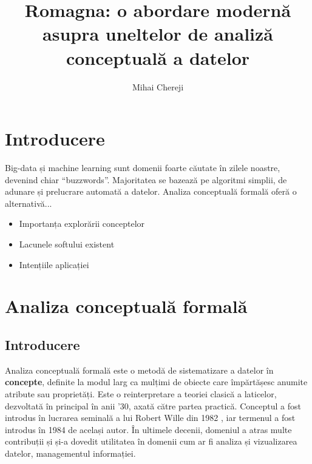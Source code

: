 \documentclass[12pt, a4paper, twoside, romanian]{teza-upb}
\begin{document}
\author{Mihai Chereji}

\title{Romagna: o abordare modernă asupra uneltelor de analiză conceptuală a datelor}




\beforepreface
\listoffigures
\listoftables
{}
\afterpreface 

\chapter*{Introducere}
  Big-data și machine learning sunt domenii foarte căutate în zilele noastre, devenind chiar “buzzwords”. Majoritatea se bazează pe algoritmi simplii, de adunare și prelucrare automată a datelor.
  Analiza conceptuală formală oferă o alternativă...
  
\begin{itemize}
  \item Importanța explorării conceptelor
  \item Lacunele softului existent
  \item Intențiile aplicației
\end{itemize}


\chapter{Analiza conceptuală formală}
  \section{Introducere}
    Analiza conceptuală formală este o metodă de sistematizare a datelor în \textbf{concepte}, definite la modul larg ca mulțimi de obiecte care împărtășesc anumite atribute sau proprietăți. Este o reinterpretare a teoriei clasică a laticelor, dezvoltată în principal în anii '30, axată către partea practică. Conceptul a fost introdus în lucrarea seminală a lui Robert Wille din 1982 \cite{wille:1982}, iar termenul a fost introdus în 1984 de același autor. În ultimele decenii, domeniul a atras multe contribuții și și-a dovedit utilitatea în domenii cum ar fi analiza și vizualizarea datelor, managementul informației.
\end{document}
